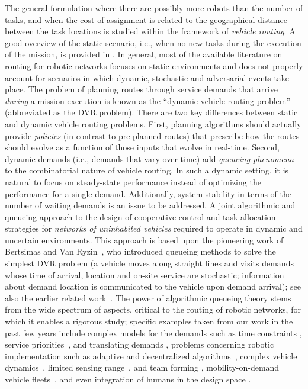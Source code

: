 The general formulation where there are possibly more robots than the number of tasks, and when the cost of assignment is related to the geographical distance between the task locations is studied within the framework of \emph{vehicle routing}. A good overview of the static scenario, i.e., when no new tasks during the execution of the mission, is provided in \cite{PT-DV:01}. In general, most of the available literature on
routing for robotic networks focuses on static environments and does not
properly account for scenarios in which dynamic, stochastic and adversarial
events take place. The problem of planning routes through service demands that arrive
\emph{during} a mission execution is known as the ``dynamic vehicle routing
problem'' (abbreviated as the DVR problem). There are two key differences between static and
dynamic vehicle routing problems. First, planning algorithms should
actually provide \emph{policies} (in contrast to pre-planned routes) that
prescribe how the routes should evolve as a function of those inputs that
evolve in real-time. Second, dynamic demands (i.e., demands that vary over
time) add \emph{queueing phenomena} to the combinatorial nature of vehicle
routing.  In such a dynamic setting, it is natural to focus on steady-state
performance instead of optimizing the performance for a single demand.
Additionally, system stability in terms of the number of waiting demands is
an issue to be addressed.
A joint algorithmic and queueing
approach to the design of cooperative control and task allocation
strategies for \emph{networks of uninhabited vehicles} required to operate
in dynamic and uncertain environments. This approach is based upon the
pioneering work of Bertsimas and Van Ryzin~\cite{Bertsimas.vanRyzin:91,Bertsimas.vanRyzin:93,Bertsimas.vanRyzin:93b}, who introduced queueing methods to solve the simplest DVR
problem (a vehicle moves along straight lines and visits demands whose time
of arrival, location and on-site service are stochastic; information about
demand location is communicated to the vehicle upon demand arrival); see
also the earlier related work~\cite{Psaraftis:88}. The power of algorithmic queueing theory stems from the wide
spectrum of aspects, critical to the routing of robotic networks, for which
it enables a rigorous study; specific examples taken from our work in the
past few years include complex models for the demands 
such as time
constraints
 \cite{Pavone.Bisnik.ea:MONE09, Pavone.Frazzoli:ICRA10}, service
priorities~\cite{Smith.Pavone:SIAM09}, and translating demands
\cite{Bopardikar.Smith.ea:10}, problems concerning robotic implementation such as
adaptive and decentralized algorithms~\cite{Pavone.Frazzoli.ea:11,
  Arsie.Savla.ea:TAC09}, complex vehicle dynamics~\cite{Savla.Frazzoli.ea:TAC08,
  Enright.Savla.ea:JGCD09}, limited sensing range~\cite{Enright.Frazzoli:06}, and team
forming \cite{Smith.Bullo:09}, mobility-on-demand vehicle fleets~\cite{Smith:2013fa}, and even integration of humans in the design
space \cite{Savla.Temple.ea:CDC08}.


